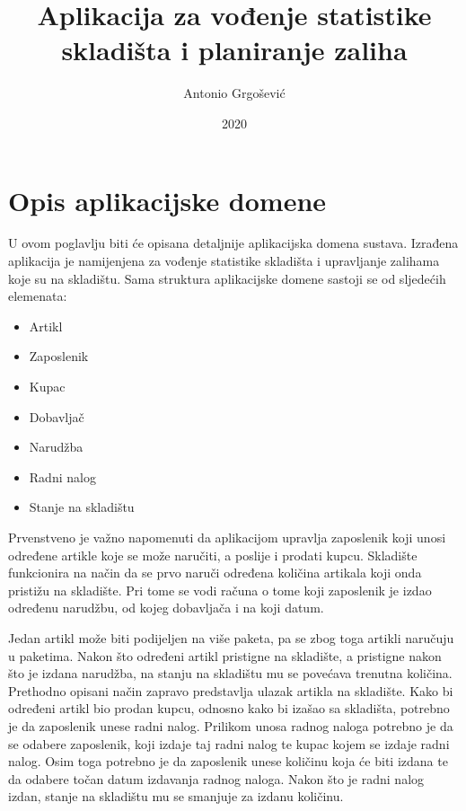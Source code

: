 \documentclass{foi}
\title{Aplikacija za vođenje statistike skladišta i planiranje zaliha}
\author{Antonio Grgošević}
\date{2020}
\begin{document}
\maketitle

\tableofcontents

\pagestyle{plain}
\chapter{Opis aplikacijske domene} %

U ovom poglavlju biti će opisana detaljnije aplikacijska domena sustava.
Izrađena aplikacija je namijenjena za vođenje statistike skladišta i upravljanje zalihama koje su na skladištu. 
Sama struktura aplikacijske domene sastoji se od sljedećih elemenata:
\begin{itemize}
    \item Artikl
    \item Zaposlenik
    \item Kupac
    \item Dobavljač
    \item Narudžba
    \item Radni nalog
    \item Stanje na skladištu
\end{itemize}

Prvenstveno je važno napomenuti da aplikacijom upravlja zaposlenik koji unosi određene artikle koje se može naručiti, a poslije i prodati kupcu. Skladište funkcionira na način da se prvo naruči određena količina artikala koji onda pristižu na skladište. Pri tome se vodi računa o tome koji zaposlenik je izdao određenu narudžbu, od kojeg dobavljača i na koji datum. 

Jedan artikl može biti podijeljen na više paketa, pa se zbog toga artikli naručuju u paketima.
Nakon što određeni artikl pristigne na skladište, a pristigne nakon što je izdana narudžba, na stanju na skladištu mu se povećava trenutna količina. Prethodno opisani način zapravo predstavlja ulazak artikla na skladište. Kako bi određeni artikl bio prodan kupcu, odnosno kako bi izašao sa skladišta, potrebno je da zaposlenik unese radni nalog. Prilikom unosa radnog naloga potrebno je da se odabere zaposlenik, koji izdaje taj radni nalog te kupac kojem se izdaje radni nalog. Osim toga potrebno je da zaposlenik unese količinu koja će biti izdana te da odabere točan datum izdavanja radnog naloga. Nakon što je radni nalog izdan, stanje na skladištu mu se smanjuje za izdanu količinu.
\end{document}
